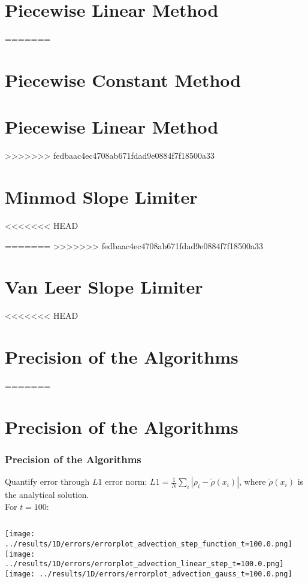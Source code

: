 \section{Piecewise Linear Method}




=======
\section{Piecewise Constant Method}


\section{Piecewise Linear Method}


>>>>>>> fedbaac4ec4708ab671fdad9e0884f7f18500a33
\section{Minmod Slope Limiter}



<<<<<<< HEAD

=======
>>>>>>> fedbaac4ec4708ab671fdad9e0884f7f18500a33
\section{Van Leer Slope Limiter}



<<<<<<< HEAD

\section{Precision of the Algorithms}

=======
\section{Precision of the Algorithms}

\begin{frame}
	\frametitle{Precision of the Algorithms}
	Quantify error through $L1$ error norm: $L1 = \frac{1}{N} \sum\limits_i |\rho_i - \tilde{\rho}(x_i)|$, where $\tilde{\rho}(x_i)$ is the analytical solution.\\[2em]
	
	For $t = 100$:\\\vfill
	
	\begin{columns}
			\texttt{[image: ../results/1D/errors/errorplot\_advection\_step\_function\_t=100.0.png]}
			\texttt{[image: ../results/1D/errors/errorplot\_advection\_linear\_step\_t=100.0.png]}
			\texttt{[image: ../results/1D/errors/errorplot\_advection\_gauss\_t=100.0.png]}	
	\end{columns}
	
\end{frame}


